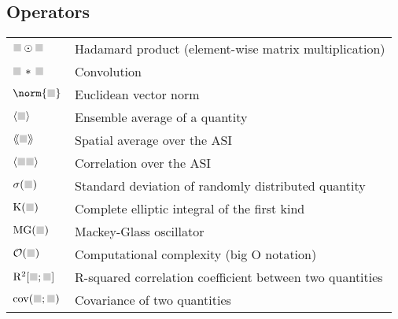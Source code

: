 \subsection*{Operators}
\vspace{-0.5em}
\begin{longtable}[l]{p{50pt} p{295pt}}
	$\greybox \odot \greybox$ & Hadamard product (element-wise matrix multiplication) \\
	$\greybox \hspace{0.15em} * \hspace{0.15em} \greybox$ & Convolution \\
	$\norm{ \greybox }$ & Euclidean vector norm \\
	$\langle \greybox \rangle$ & Ensemble average of a quantity \\
	$\llangle \greybox \rrangle$ & Spatial average over the ASI \\
	$\langle \greybox \greybox \rangle$ & Correlation over the ASI \\
	$\sigma( \greybox )$ & Standard deviation of randomly distributed quantity \\
	$\mathrm{K}(\greybox)$ & Complete elliptic integral of the first kind \\
	$\mathrm{MG}(\greybox)$ & Mackey-Glass oscillator \\
	$\mathcal{O}(\greybox)$ & Computational complexity (big O notation) \\
	$\mathrm{R}^2[\greybox;\greybox]$ & R-squared correlation coefficient between two quantities \\
	$\mathrm{cov}(\greybox;\greybox)$ & Covariance of two quantities\vspace{\whiteline}\\
\end{longtable}

